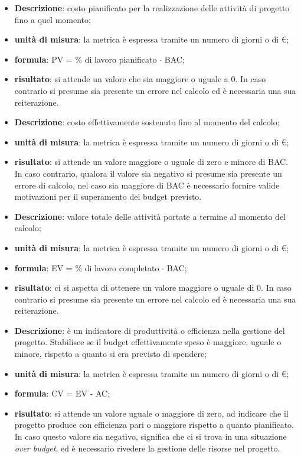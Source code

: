		\begin{itemize}
			\item \textbf{Descrizione}: costo pianificato per la realizzazione delle attività di progetto fino a quel momento;
			\item \textbf{unità di misura}: la metrica è espressa tramite un numero di giorni o di €;
			\item \textbf{formula}: PV = \% di lavoro pianificato $\cdot{}$ BAC;
			\item \textbf{risultato}: si attende un valore che sia maggiore o uguale a 0. In caso contrario si presume sia presente un errore nel calcolo ed è necessaria una sua reiterazione.
		\end{itemize}
		\begin{itemize}
			\item \textbf{Descrizione}: costo effettivamente sostenuto fino al momento del calcolo;
			\item \textbf{unità di misura}: la metrica è espressa tramite un numero di giorni o di €;
			\item \textbf{risultato}: si attende un valore maggiore o uguale di zero e minore di BAC. In caso contrario, qualora il valore sia negativo si presume sia presente un errore di calcolo, nel caso sia maggiore di BAC è necessario fornire valide motivazioni per il superamento del budget previsto.
		\end{itemize}
		\begin{itemize}
			\item \textbf{Descrizione}: valore totale delle attività portate a termine al momento del calcolo;
			\item \textbf{unità di misura}: la metrica è espressa tramite un numero di giorni o di €;
			\item \textbf{formula}: EV = \% di lavoro completato $\cdot{}$ BAC;
			\item \textbf{risultato}: ci si aspetta di ottenere un valore maggiore o uguale di 0. In caso contrario si presume sia presente un errore nel calcolo ed è necessaria una sua reiterazione.
		\end{itemize}
		\begin{itemize}
			\item \textbf{Descrizione}: è un indicatore di produttività o efficienza nella gestione del progetto. Stabilisce se il budget effettivamente speso è maggiore, uguale o minore, rispetto a quanto si era previsto di spendere;
			\item \textbf{unità di misura}: la metrica è espressa tramite un numero di giorni o di €;
			\item \textbf{formula}: CV = EV - AC;
			\item \textbf{risultato}: si attende un valore uguale o maggiore di zero, ad indicare che il progetto produce con efficienza pari o maggiore rispetto a quanto pianificato. In caso questo valore sia negativo, significa che ci si trova in una situazione \textit{over budget}, ed è necessario rivedere la gestione delle risorse nel progetto.
		\end{itemize}
